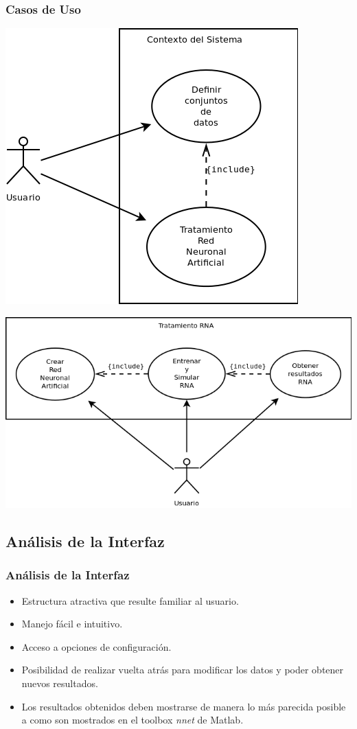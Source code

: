 \documentclass[compress,allowframebreaks]{beamer}
\begin{document}
			\begin{frame}[allowframebreaks]
				\frametitle{\normalsize Casos de Uso}

				\centering
				\includegraphics[scale=0.45]{uml/DiagramaContexto.png}
				
				\centering
				\includegraphics[scale=0.45]{uml/DiagramaNivel1.png}
			\end{frame}

		\subsection{Análisis de la Interfaz}

			\begin{frame}
				\frametitle{\normalsize Análisis de la Interfaz}

				\begin{itemize}\justifying
					\item Estructura atractiva que resulte familiar al usuario.
					\item Manejo fácil e intuitivo.
					\item Acceso a opciones de configuración.
					\item Posibilidad de realizar vuelta atrás para modificar los datos y poder obtener nuevos resultados.
					\item Los resultados obtenidos deben mostrarse de manera lo más parecida posible a como son mostrados en el toolbox \textit{nnet} de Matlab.
				\end{itemize}
			\end{frame}
\end{document}
